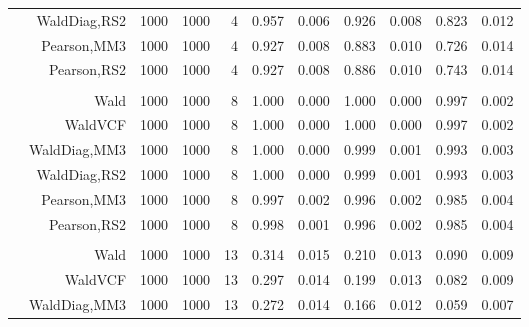 \documentclass[
]{article}
\begin{document}
\begin{table}[H]
{\begin{tabular}[t]{lrrrrrrrlrr}
\hspace{1em} & WaldDiag,RS2 & 1000 & 1000 & 4 & 0.957 & 0.006 & 0.926 & 0.008 & 0.823 & 0.012\\

\hspace{1em} & Pearson,MM3 & 1000 & 1000 & 4 & 0.927 & 0.008 & 0.883 & 0.010 & 0.726 & 0.014\\

\hspace{1em} & Pearson,RS2 & 1000 & 1000 & 4 & 0.927 & 0.008 & 0.886 & 0.010 & 0.743 & 0.014\\
\cmidrule{1-11}
\addlinespace[0.3em]
\multicolumn{11}{l}{\textbf{1F 15V}}\\
\hspace{1em} & Wald & 1000 & 1000 & 8 & 1.000 & 0.000 & 1.000 & 0.000 & 0.997 & 0.002\\

\hspace{1em} & WaldVCF & 1000 & 1000 & 8 & 1.000 & 0.000 & 1.000 & 0.000 & 0.997 & 0.002\\

\hspace{1em} & WaldDiag,MM3 & 1000 & 1000 & 8 & 1.000 & 0.000 & 0.999 & 0.001 & 0.993 & 0.003\\

\hspace{1em} & WaldDiag,RS2 & 1000 & 1000 & 8 & 1.000 & 0.000 & 0.999 & 0.001 & 0.993 & 0.003\\

\hspace{1em} & Pearson,MM3 & 1000 & 1000 & 8 & 0.997 & 0.002 & 0.996 & 0.002 & 0.985 & 0.004\\

\hspace{1em} & Pearson,RS2 & 1000 & 1000 & 8 & 0.998 & 0.001 & 0.996 & 0.002 & 0.985 & 0.004\\
\cmidrule{1-11}
\addlinespace[0.3em]
\multicolumn{11}{l}{\textbf{2F 10V}}\\
\hspace{1em} & Wald & 1000 & 1000 & 13 & 0.314 & 0.015 & 0.210 & 0.013 & 0.090 & 0.009\\

\hspace{1em} & WaldVCF & 1000 & 1000 & 13 & 0.297 & 0.014 & 0.199 & 0.013 & 0.082 & 0.009\\

\hspace{1em} & WaldDiag,MM3 & 1000 & 1000 & 13 & 0.272 & 0.014 & 0.166 & 0.012 & 0.059 & 0.007\\


\end{tabular}}
\end{table}
\end{document}
